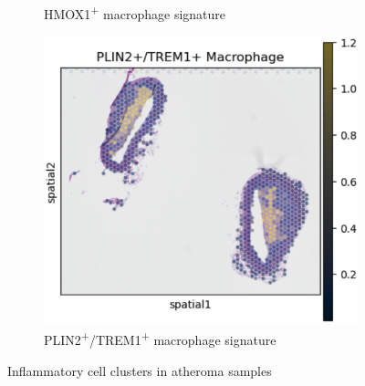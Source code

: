 \documentclass[a4paper,12pt]{article}
\begin{document}
\begin{figure}[H]
\begin{subfigure}{0.3\textwidth}
\caption{HMOX1\textsuperscript{+} macrophage signature}
\label{fig:atherosclerosis_spatial}
\end{subfigure}
\hfill
\begin{subfigure}{0.3\textwidth}
\includegraphics[width=\textwidth]{plnpa6}
\caption{PLIN2\textsuperscript{+}/TREM1\textsuperscript{+} macrophage signature}
\label{fig:atherosclerosis_spatial}
\end{subfigure}
\caption{Inflammatory cell clusters in atheroma samples}
\label{fig:spatial_deconvolution}
\end{figure}
\end{document}
